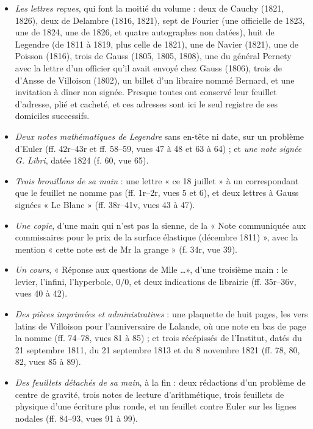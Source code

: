 \documentclass[11pt,a4paper]{article}
\begin{document}
\begin{itemize}
  \item \emph{Les lettres reçues}, qui font la moitié du volume : deux de
    Cauchy (1821, 1826), deux de Delambre (1816, 1821), sept de Fourier (une
    officielle de 1823, une de 1824, une de 1826, et quatre autographes non
    datées), huit de Legendre (de 1811 à 1819, plus celle de 1821), une de
    Navier (1821), une de Poisson (1816), trois de Gauss (1805, 1805, 1808),
    une du général Pernety avec la lettre d'un officier qu'il avait envoyé
    chez Gauss (1806), trois de d'Ansse de Villoison (1802), un billet d'un
    libraire nommé Bernard, et une invitation à dîner non signée. Presque
    toutes ont conservé leur feuillet d'adresse, plié et cacheté, et ces
    adresses sont ici le seul registre de ses domiciles successifs.
  \item \emph{Deux notes mathématiques de Legendre} sans en-tête ni date,
    sur un problème d'Euler (ff. 42r–43r et ff. 58–59, vues 47 à 48 et 63 à
    64) ; et \emph{une note signée G. Libri}, datée 1824 (f. 60, vue 65).
  \item \emph{Trois brouillons de sa main} : une lettre « ce 18 juillet » à un
    correspondant que le feuillet ne nomme pas (ff. 1r–2r, vues 5 et 6), et
    deux lettres à Gauss signées « Le Blanc » (ff. 38r–41v, vues 43 à 47).
  \item \emph{Une copie}, d'une main qui n'est pas la sienne, de la « Note
    communiquée aux commissaires pour le prix de la surface élastique
    (décembre 1811) », avec la mention « cette note est de Mr la grange »
    (f. 34r, vue 39).
  \item \emph{Un cours}, « Réponse aux questions de Mlle \ldots », d'une
    troisième main : le levier, l'infini, l'hyperbole, $0/0$, et deux
    indications de librairie (ff. 35r–36v, vues 40 à 42).
  \item \emph{Des pièces imprimées et administratives} : une plaquette de huit
    pages, les vers latins de Villoison pour l'anniversaire de Lalande, où une
    note en bas de page la nomme (ff. 74–78, vues 81 à 85) ; et trois
    récépissés de l'Institut, datés du 21 septembre 1811, du 21 septembre 1813
    et du 8 novembre 1821 (ff. 78, 80, 82, vues 85 à 89).
  \item \emph{Des feuillets détachés de sa main}, à la fin : deux rédactions
    d'un problème de centre de gravité, trois notes de lecture
    d'arithmétique, trois feuillets de physique d'une écriture plus ronde, et
    un feuillet contre Euler sur les lignes nodales (ff. 84–93, vues 91 à 99).
\end{itemize}
\end{document}
